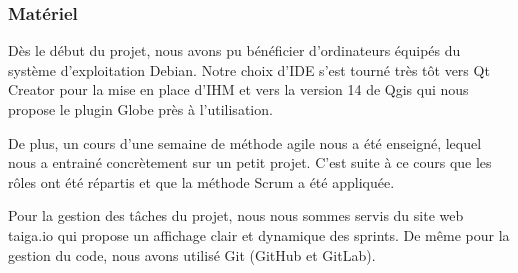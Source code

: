 \subsubsection{Matériel}
Dès le début du projet, nous avons pu bénéficier d'ordinateurs équipés du système d'exploitation Debian. Notre choix d'IDE s'est tourné très tôt vers Qt Creator pour la mise en place d'IHM et vers la version 14 de Qgis qui nous propose le plugin Globe près à l'utilisation.

De plus, un cours d'une semaine de méthode agile nous a été enseigné, lequel nous a entrainé concrètement sur un petit projet. C'est suite à ce cours que les rôles ont été répartis et que la méthode Scrum a été appliquée.

Pour la gestion des tâches du projet, nous nous sommes servis du site web taiga.io qui propose un affichage clair et dynamique des sprints. De même pour la gestion du code, nous avons utilisé Git (GitHub et GitLab).